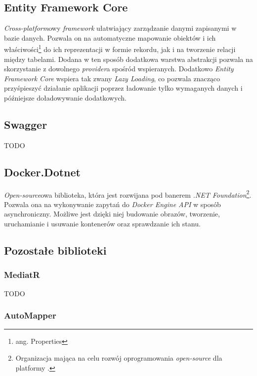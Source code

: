 \subsection{Entity Framework Core}

\par \emph{Cross-platform}owy \emph{framework} ułatwiający zarządzanie danymi zapisanymi w bazie danych. Pozwala on na automatyczne mapowanie obiektów i ich właściwości\footnote{ang. Properties} do ich reprezentacji w formie rekordu, jak i na tworzenie relacji między tabelami. Dodana w ten sposób dodatkowa warstwa abstrakcji pozwala na skorzystanie z dowolnego \emph{provider}a spośród wspieranych. Dodatkowo \emph{Entity Framework Core} wspiera tak zwany \emph{Lazy Loading}, co pozwala znacząco przyśpieszyć działanie aplikacji poprzez ładowanie tylko wymaganych danych i późniejsze doładowywanie dodatkowych.

\subsection{Swagger}

TODO %

\subsection{Docker.Dotnet}

\par \emph{Open-source}owa biblioteka, która jest rozwijana pod banerem \emph{.NET Foundation}\footnote{Organizacja mająca na celu rozwój oprogramowania \emph{open-source} dla platformy \emph{\dotnet{}}.}. Pozwala ona na wykonywanie zapytań do \emph{Docker Engine API} w sposób asynchroniczny. Możliwe jest dzięki niej budowanie obrazów, tworzenie, uruchamianie i usuwanie kontenerów oraz sprawdzanie ich stanu.

\subsection{Pozostałe biblioteki}

\subsubsection{MediatR}

TODO %

\subsubsection{AutoMapper}

